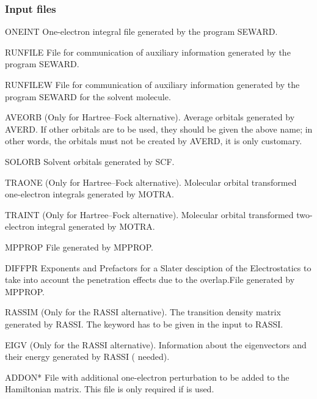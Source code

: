 \subsubsection{Input files}
\begin{filelist}
\item[ONEINT]
One{}-electron integral file generated by the program {\prgmfont SEWARD}.
\item[RUNFILE]
File for communication of auxiliary information generated by the program
{\prgmfont SEWARD}.
\item[RUNFILEW]
File for communication of auxiliary information generated by the program
{\prgmfont SEWARD} for the solvent molecule.
\item[AVEORB]
(Only for Hartree--Fock alternative). Average orbitals generated by {\prgmfont AVERD}.
If other orbitals are to
be used, they should be given the above name; in other words, the orbitals
must not be created by {\prgmfont AVERD}, it is only customary.
\item[SOLORB]
Solvent orbitals generated by {\prgmfont SCF}.
\item[TRAONE]
(Only for Hartree--Fock alternative). Molecular orbital transformed one-electron
integrals generated by {\prgmfont MOTRA}.
\item[TRAINT]
(Only for Hartree--Fock alternative). Molecular orbital transformed two-electron
integral generated by {\prgmfont MOTRA}.
\item[MPPROP]
File generated by {\prgmfont MPPROP}.
\item[DIFFPR]
Exponents and Prefactors for a Slater desciption of the Electrostatics to take
into account the penetration effects due to the overlap.File generated by {\prgmfont MPPROP}.
\item[RASSIM]
(Only for the RASSI alternative). The transition density matrix generated
by {\prgmfont RASSI}. The keyword  has to be given in
the input to {\prgmfont RASSI}.
\item[EIGV]
(Only for the RASSI alternative). Information about the eigenvectors and
their energy generated by {\prgmfont RASSI} ( needed).
\item[ADDON*]
File with additional one-electron perturbation to be added
to the Hamiltonian matrix. This file is only required if 
is used.
\end{filelist}

